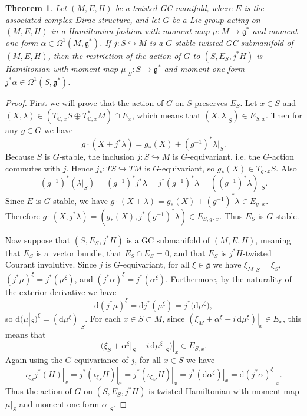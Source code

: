\documentclass[pdftex]{sigma}
\newtheorem{Theorem}{Theorem}[section]
\numberwithin{equation}{section}
\newcommand{\func}[3]{#1 \colon #2 \to #3}
\newcommand{\hookfunc}[3]{#1 \colon #2 \hookrightarrow #3}
\newcommand{\eval}[2]{\left. #1 \right|_{#2}}
\newcommand{\tang}{T}
\begin{document}
\begin{Theorem} \label{thm6}
Let $(M,E,H)$ be a twisted GC manifold, where $E$ is the associated complex Dirac structure, and let $G$ be a Lie group acting on $(M,E,H)$ in a Hamiltonian fashion with moment map $\func{\mu}{M}{\mathfrak{g}^*}$ and moment one-form $\alpha \in \Omega^1(M,\mathfrak{g}^*)$.
If $\hookfunc{j}{S}{M}$ is a $G$-stable twisted GC submanifold of $(M,E,H)$, then the restriction of the action of $G$ to $(S,E_S,j^* H)$ is Hamiltonian with moment map $\func{\mu|_S}{S}{\mathfrak{g}^*}$ and moment one-form $j^* \alpha \in \Omega^1(S,\mathfrak{g}^*)$.
\end{Theorem}


\begin{proof}
First we will prove that the action of $G$ on $S$ preserves $E_S$.  Let $x \in S$ and $(X, \lambda) \in (\tang_{\mathbb{C}, x} S \oplus \tang_{\mathbb{C}, x}^{\ast} M) \cap E_x$, which means that $(X, \lambda|_S) \in E_{S,x}$.  Then for any $g \in G$ we have
\[
  g \cdot (X + j^* \lambda) = g_* (X) + (g^{-1})^* \lambda|_S.
\]
Because $S$ is $G$-stable, the inclusion $\hookfunc{j}{S}{M}$ is $G$-equivariant, i.e. the $G$-action commutes with $j$.  Hence $\hookfunc{j_*}{\tang S}{\tang M}$ is $G$-equivariant, so $g_* (X) \in \tang_{g \cdot x} S$.  Also
\[
  (g^{-1})^* \left( \lambda|_S \right)
  =
  (g^{-1})^* j^* \lambda
  =
  j^* (g^{-1})^* \lambda
  =
  \left( (g^{-1})^* \lambda \right)|_S.
\]
Since $E$ is $G$-stable, we have $g \cdot (X + \lambda) = g_* (X) + (g^{-1})^* \lambda \in E_{g \cdot x}$.  Therefore $g \cdot (X, j^* \lambda) = \left( g_* (X), j^* (g^{-1})^* \lambda \right) \in E_{S, g \cdot x}$.  Thus $E_S$ is $G$-stable.


Now suppose that $(S,E_S,j^* H)$ is a GC submanifold of $(M,E,H)$, meaning that $E_S$ is a~vector bundle, that $E_S \cap \overline{E_S} = 0$, and that $E_S$ is $j^* H$-twisted Courant involutive.  Since $j$ is $G$-equivariant, for all $\xi \in \mathfrak{g}$ we have $\xi_M|_S = \xi_S$, $(j^* \mu)^{\xi} = j^* (\mu^{\xi})$, and $(j^* \alpha)^{\xi} = j^* (\alpha^{\xi})$.  Furthermore, by the naturality of the exterior derivative we have
\[
  \mathrm{d} (j^* \mu)^{\xi}
  =
  \mathrm{d} j^* (\mu^{\xi})
  =
  j^* \big(\mathrm{d} \mu^{\xi}\big),
\]
so $\mathrm{d} (\mu|_{S})^{\xi} = (\mathrm{d} \mu^{\xi})|_S$.  For each $x \in S \subset M$, since $\eval{\left( \xi_M + \alpha^{\xi} - i \, \mathrm{d} \mu^{\xi} \right)}{x} \in E_x$, this means that
\[
  \eval{\big( \xi_S + \alpha^{\xi}|_S - i \, \mathrm{d} \mu^{\xi}\big|_S \big)}{x} \in E_{S,x}.
\]
Again using the $G$-equivariance of $j$, for all $x \in S$ we have
\[
  \eval{\iota_{\xi_S} j^* (H)}{x}
  =
  \eval{j^* (\iota_{\xi_S} H)}{x}
  =
  \eval{j^* (\iota_{\xi_M} H)}{x}
  =
  \eval{j^* (\mathrm{d} \alpha^{\xi})}{x}
  =
  \eval{\mathrm{d} (j^* \alpha)^{\xi}}{x}.
\]
Thus the action of $G$ on $(S,E_S,j^* H)$ is twisted Hamiltonian with moment map $\mu|_S$ and moment one-form $\alpha|_S$.
\end{proof}
\end{document}
